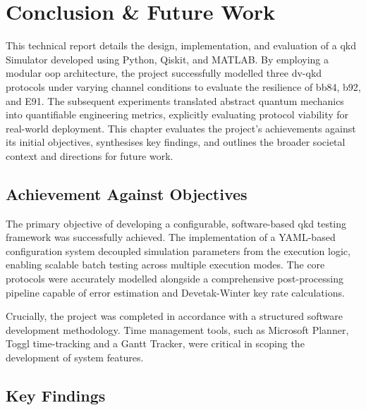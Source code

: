 \chapter{Conclusion \& Future Work}

This technical report details the design, implementation, and evaluation of a \gls{qkd} Simulator developed using Python, Qiskit, and MATLAB. By employing a modular \gls{oop} architecture, the project successfully modelled three \gls{dv}-\gls{qkd} protocols under varying channel conditions to evaluate the resilience of \gls{bb84}, \gls{b92}, and E91. The subsequent experiments translated abstract quantum mechanics into quantifiable engineering metrics, explicitly evaluating protocol viability for real-world deployment. This chapter evaluates the project's achievements against its initial objectives, synthesises key findings, and outlines the broader societal context and directions for future work.

\section{Achievement Against Objectives}
\label{sec:achievements}

The primary objective of developing a configurable, software-based \gls{qkd} testing framework was successfully achieved. The implementation of a YAML-based configuration system decoupled simulation parameters from the execution logic, enabling scalable batch testing across multiple execution modes. The core protocols were accurately modelled alongside a comprehensive post-processing pipeline capable of error estimation and Devetak-Winter key rate calculations. 


Crucially, the project was completed in accordance with a structured software development methodology. Time management tools, such as Microsoft Planner, Toggl time-tracking and a Gantt Tracker, were critical in scoping the development of system features.


\section{Key Findings}
\label{sec:key}

